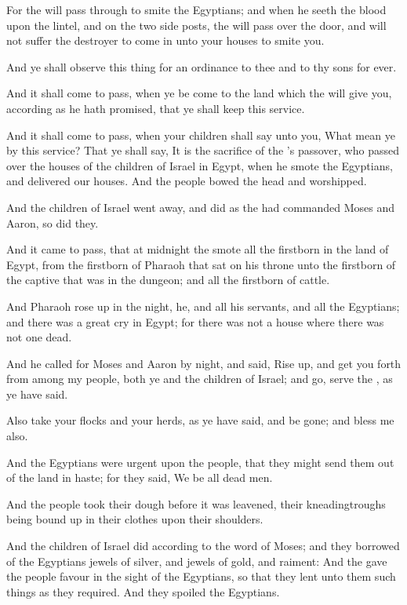 \verse For the \LORD will pass through to smite the Egyptians; and when
he seeth the blood upon the lintel, and on the two side posts, the
\LORD will pass over the door, and will not suffer the destroyer to
come in unto your houses to smite you.

\verse And ye shall observe this thing for an ordinance to thee and to
thy sons for ever.

\verse And it shall come to pass, when ye be come to the land which the
\LORD will give you, according as he hath promised, that ye shall keep
this service.

\verse And it shall come to pass, when your children shall say unto
you, What mean ye by this service?  \verse That ye shall say, It is the
sacrifice of the \LORD's passover, who passed over the houses of the
children of Israel in Egypt, when he smote the Egyptians, and
delivered our houses. And the people bowed the head and worshipped.

\verse And the children of Israel went away, and did as the \LORD had
commanded Moses and Aaron, so did they.

\verse And it came to pass, that at midnight the \LORD smote all the
firstborn in the land of Egypt, from the firstborn of Pharaoh that sat
on his throne unto the firstborn of the captive that was in the
dungeon; and all the firstborn of cattle.

\verse And Pharaoh rose up in the night, he, and all his servants, and
all the Egyptians; and there was a great cry in Egypt; for there was
not a house where there was not one dead.

\verse And he called for Moses and Aaron by night, and said, Rise up,
and get you forth from among my people, both ye and the children of
Israel; and go, serve the \LORD, as ye have said.

\verse Also take your flocks and your herds, as ye have said, and be
gone; and bless me also.

\verse And the Egyptians were urgent upon the people, that they might
send them out of the land in haste; for they said, We be all dead men.

\verse And the people took their dough before it was leavened, their
kneadingtroughs being bound up in their clothes upon their shoulders.

\verse And the children of Israel did according to the word of Moses;
and they borrowed of the Egyptians jewels of silver, and jewels of
gold, and raiment: \verse And the \LORD gave the people favour in the
sight of the Egyptians, so that they lent unto them such things as
they required. And they spoiled the Egyptians.

